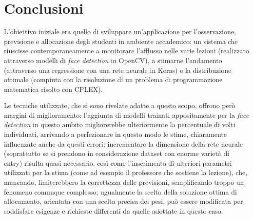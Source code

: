 \chapter{Conclusioni}
\label{section:conclusion}

L'obiettivo iniziale era quello di sviluppare un'applicazione per l'osservazione, previsione e 
allocazione degli studenti in ambiente accademico: un sistema che riuscisse contemporaneamente a 
monitorare l'afflusso nelle varie lezioni (realizzato attraverso modelli di \textit{face detection} 
in OpenCV), a stimarne l'andamento (attraverso una regressione con una rete neurale in Keras) e 
la distribuzione ottimale (compiuta con la risoluzione di un problema di programmazione matematica
risolto con CPLEX).

\smallskip

Le tecniche utilizzate, che si sono rivelate adatte a questo scopo, offrono però margini di miglioramento:
l'aggiunta di modelli trainati appositamente per la \textit{face detection} in questo ambito migliorerebbe 
ulteriormente la percentuale di volti individuati, arrivando a perfezionare in questo modo le stime,
chiaramente influenzate anche da questi errori; incrementare la dimensione della rete neurale (soprattutto se si 
prendono in considerazione dataset con enorme varietà di entry) risulta quasi necessario, così come 
l'inserimento di ulteriori parametri utilizzati per la stima (come ad esempio il professore che sostiene 
la lezione), che, mancando, limiterebbero la correttezza delle previsioni, semplificando troppo
un fenomeno comunque complesso; ugualmente la scelta della soluzione ottima di allocamento, orientata con una scelta precisa dei pesi, 
può essere modificata per soddisfare esigenze e richieste differenti da quelle adottate in questo caso.

